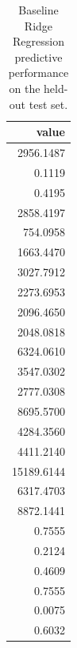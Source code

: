 \begin{table}
\caption{Baseline Ridge Regression predictive performance on the held-out test set.}
\label{tab:03-ridge-metrics}
\begin{tabular}{r}
\toprule
value \\
\midrule
2956.1487 \\
0.1119 \\
0.4195 \\
2858.4197 \\
754.0958 \\
1663.4470 \\
3027.7912 \\
2273.6953 \\
2096.4650 \\
2048.0818 \\
6324.0610 \\
3547.0302 \\
2777.0308 \\
8695.5700 \\
4284.3560 \\
4411.2140 \\
15189.6144 \\
6317.4703 \\
8872.1441 \\
0.7555 \\
0.2124 \\
0.4609 \\
0.7555 \\
0.0075 \\
0.6032 \\
\bottomrule
\end{tabular}
\end{table}
